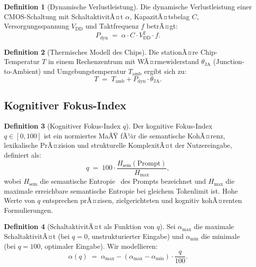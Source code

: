 ﻿\documentclass[a4paper,12pt]{article}
\theoremstyle{definition}
\newtheorem{definition}{Definition}
\begin{document}
\begin{definition}[Dynamische Verlustleistung]
Die dynamische Verlustleistung einer CMOS-Schaltung mit SchaltaktivitÃ¤t $\alpha$,
KapazitÃ¤tsbelag $C$, Versorgungsspannung $V_{\mathrm{DD}}$ und Taktfrequenz $f$ betrÃ¤gt:
\[
P_{\mathrm{dyn}} \;=\; \alpha \cdot C \cdot V_{\mathrm{DD}}^2 \cdot f.
\]
\end{definition}

\begin{definition}[Thermisches Modell des Chips]
Die stationÃ¤re Chip-Temperatur $T$ in einem Rechenzentrum mit WÃ¤rmewiderstand
$\theta_{\mathrm{JA}}$ (Junction-to-Ambient) und Umgebungstemperatur $T_{\mathrm{amb}}$
ergibt sich zu:
\[
T \;=\; T_{\mathrm{amb}} + P_{\mathrm{dyn}} \cdot \theta_{\mathrm{JA}}.
\]
\end{definition}

\subsection{Kognitiver Fokus-Index}

\begin{definition}[Kognitiver Fokus-Index $q$]
Der kognitive Fokus-Index $q \in [0,100]$ ist ein normiertes MaÃŸ fÃ¼r die semantische
KohÃ¤renz, lexikalische PrÃ¤zision und strukturelle KomplexitÃ¤t der Nutzereingabe, definiert als:
\[
q \;=\; 100 \cdot \frac{H_{\mathrm{sem}}(\text{Prompt})}{H_{\mathrm{max}}},
\]
wobei $H_{\mathrm{sem}}$ die semantische Entropie~\cite{Shannon1948} des Prompts bezeichnet
und $H_{\mathrm{max}}$ die maximale erreichbare semantische Entropie bei gleichem
Tokenlimit ist. Hohe Werte von $q$ entsprechen prÃ¤zisen, zielgerichteten und kognitiv
kohÃ¤renten Formulierungen.
\end{definition}

\begin{definition}[SchaltaktivitÃ¤t als Funktion von $q$]
\label{def:alpha_q}
Sei $\alpha_{\mathrm{max}}$ die maximale SchaltaktivitÃ¤t (bei $q=0$, unstrukturierter Eingabe)
und $\alpha_{\mathrm{min}}$ die minimale (bei $q=100$, optimaler Eingabe). Wir modellieren:
\[
\alpha(q) \;=\; \alpha_{\mathrm{max}} - (\alpha_{\mathrm{max}} - \alpha_{\mathrm{min}}) \cdot \frac{q}{100}.
\]
\end{definition}

\end{document}
